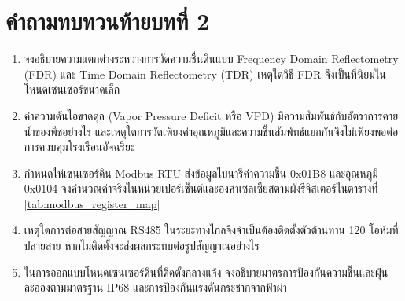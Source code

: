 \clearpage

\section*{คำถามทบทวนท้ายบทที่ 2}

\begin{enumerate}
    \item จงอธิบายความแตกต่างระหว่างการวัดความชื้นดินแบบ Frequency Domain Reflectometry (FDR) และ Time Domain Reflectometry (TDR) เหตุใดวิธี FDR จึงเป็นที่นิยมในโหนดเซนเซอร์ขนาดเล็ก
    \item ค่าความดันไอขาดดุล (Vapor Pressure Deficit หรือ VPD) มีความสัมพันธ์กับอัตราการคายน้ำของพืชอย่างไร และเหตุใดการวัดเพียงค่าอุณหภูมิและความชื้นสัมพัทธ์แยกกันจึงไม่เพียงพอต่อการควบคุมโรงเรือนอัจฉริยะ
    \item กำหนดให้เซนเซอร์ดิน Modbus RTU ส่งข้อมูลไบนารีค่าความชื้น 0x01B8 และอุณหภูมิ 0x0104 จงคำนวณค่าจริงในหน่วยเปอร์เซ็นต์และองศาเซลเซียสตามผังรีจิสเตอร์ในตารางที่ \ref{tab:modbus_register_map}
    \item เหตุใดการต่อสายสัญญาณ RS485 ในระยะทางไกลจึงจำเป็นต้องติดตั้งตัวต้านทาน 120 โอห์มที่ปลายสาย หากไม่ติดตั้งจะส่งผลกระทบต่อรูปสัญญาณอย่างไร
    \item ในการออกแบบโหนดเซนเซอร์ดินที่ติดตั้งกลางแจ้ง จงอธิบายมาตรการป้องกันความชื้นและฝุ่นละอองตามมาตรฐาน IP68 และการป้องกันแรงดันกระชากจากฟ้าผ่า
\end{enumerate}

\clearpage
